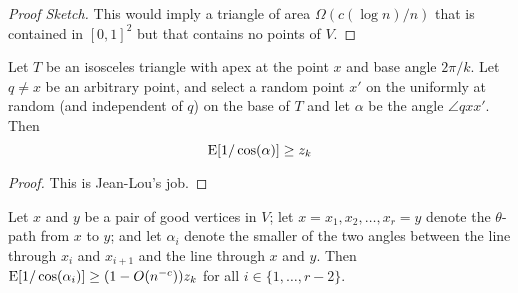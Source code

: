 \documentclass{patmorin}
\begin{document}
\begin{proof}[Proof Sketch]
  This would imply a triangle of area $\Omega(c(\log n)/n)$ that is
  contained in $[0,1]^2$ but that contains no points of $V$.
\end{proof}

\begin{lem}
  Let $T$ be an isosceles triangle with apex at the point $x$ and base
  angle $2\pi/k$.  Let $q\neq x$ be an arbitrary point, and select a
  random point $x'$ on the uniformly at random (and independent of $q$)
  on the base of $T$ and let $\alpha$ be the angle $\angle qxx'$.  Then
  \[
    \mathrm{E}[1/\cos(\alpha)] \ge z_k
  \] 
\end{lem}

\begin{proof}
This is Jean-Lou's job.
\end{proof}


\begin{lem}
  Let $x$ and $y$ be a pair of good vertices in $V$;
  let $x=x_1,x_2,\ldots,x_r=y$ denote the $\theta$-path from $x$ to $y$; and 
  let $\alpha_i$ denote the smaller of the two angles between the line
  through $x_i$ and $x_{i+1}$ and the line through $x$ and $y$.  Then
  $\mathrm{E}[1/\cos(\alpha_i)] \ge (1-O(n^{-c}))z_k$ for all $i\in\{1,\ldots,r-2\}$.
\end{lem}
\end{document}

